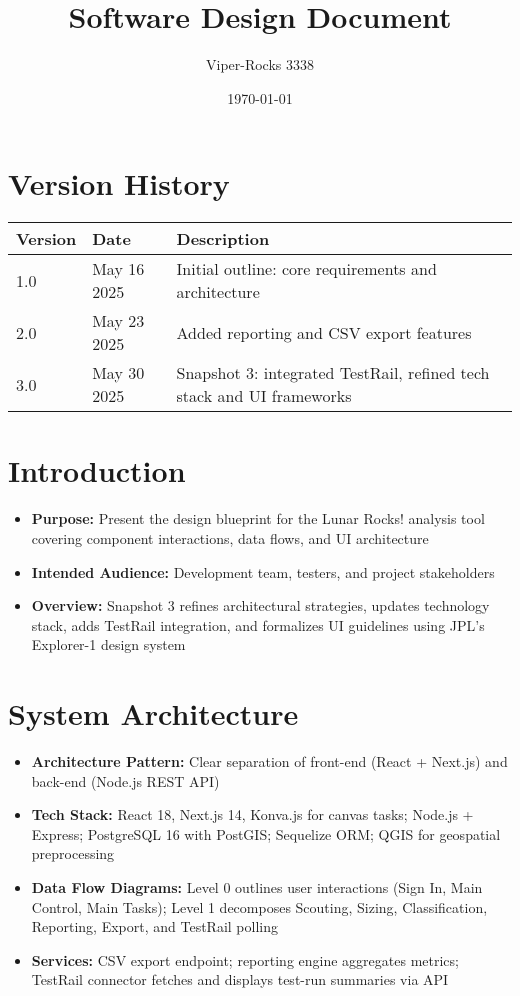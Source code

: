 \documentclass{article}
\title{Software Design Document}
\author{Viper-Rocks 3338}
\date{\today}
\begin{document}
\maketitle

\tableofcontents
\newpage

\section*{Version History}
\begin{tabular}{|l|l|p{8cm}|}
\hline
\textbf{Version} & \textbf{Date}       & \textbf{Description} \\ \hline
1.0   & May 16 2025          & Initial outline: core requirements and architecture \\ \hline
2.0   & May 23 2025          & Added reporting and CSV export features \\ \hline
3.0   & May 30 2025          & Snapshot 3: integrated TestRail, refined tech stack and UI frameworks \\ \hline
\end{tabular}

\section{Introduction}
\begin{itemize}
  \item \textbf{Purpose:} Present the design blueprint for the Lunar Rocks! analysis tool covering component interactions, data flows, and UI architecture
  \item \textbf{Intended Audience:} Development team, testers, and project stakeholders
  \item \textbf{Overview:} Snapshot 3 refines architectural strategies, updates technology stack, adds TestRail integration, and formalizes UI guidelines using JPL’s Explorer-1 design system
\end{itemize}

\section{System Architecture}
\begin{itemize}
  \item \textbf{Architecture Pattern:} Clear separation of front-end (React + Next.js) and back-end (Node.js REST API)
  \item \textbf{Tech Stack:} React 18, Next.js 14, Konva.js for canvas tasks; Node.js + Express; PostgreSQL 16 with PostGIS; Sequelize ORM; QGIS for geospatial preprocessing
  \item \textbf{Data Flow Diagrams:} Level 0 outlines user interactions (Sign In, Main Control, Main Tasks); Level 1 decomposes Scouting, Sizing, Classification, Reporting, Export, and TestRail polling
  \item \textbf{Services:} CSV export endpoint; reporting engine aggregates metrics; TestRail connector fetches and displays test-run summaries via API
\end{itemize}
\end{document}
